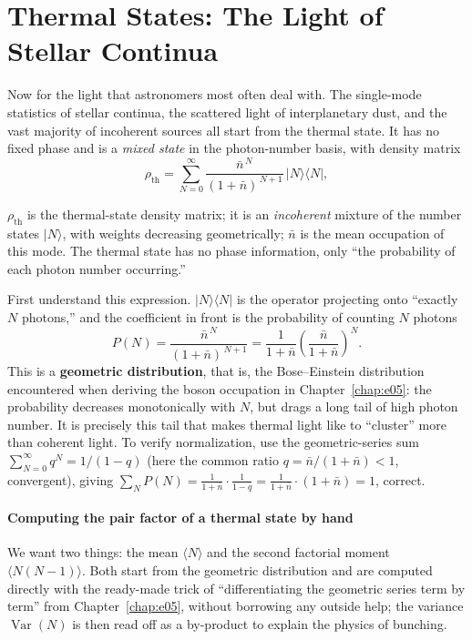 \section{Thermal States: The Light of Stellar Continua}
\label{sec:e06-thermal}

Now for the light that astronomers most often deal with. The single-mode statistics of stellar continua, the scattered light of interplanetary dust, and the vast majority of incoherent sources all start from the thermal state. It has no fixed phase and is a \emph{mixed state} in the photon-number basis, with density matrix
\begin{equation}
  \rho_{\text{th}}=\sum_{N=0}^{\infty}
  \frac{\bar n^{\,N}}{(1+\bar n)^{\,N+1}}\,|N\rangle\langle N|,
  \label{eq:e06-thermal-rho}
\end{equation}
\begin{formulaexplain}
\(\rho_{\text{th}}\) is the thermal-state density matrix; it is an \emph{incoherent} mixture of the number states \(|N\rangle\), with weights decreasing geometrically; \(\bar n\) is the mean occupation of this mode. The thermal state has no phase information, only ``the probability of each photon number occurring.''
\end{formulaexplain}

First understand this expression. \(|N\rangle\langle N|\) is the operator projecting onto ``exactly \(N\) photons,'' and the coefficient in front is the probability of counting \(N\) photons
\[
  P(N)=\frac{\bar n^{\,N}}{(1+\bar n)^{\,N+1}}
  =\frac{1}{1+\bar n}\left(\frac{\bar n}{1+\bar n}\right)^{N}.
\]
This is a \textbf{geometric distribution}, that is, the Bose--Einstein distribution encountered when deriving the boson occupation in Chapter~\ref{chap:e05}: the probability decreases monotonically with \(N\), but drags a long tail of high photon number. It is precisely this tail that makes thermal light like to ``cluster'' more than coherent light. To verify normalization, use the geometric-series sum \(\sum_{N=0}^\infty q^N=1/(1-q)\) (here the common ratio \(q=\bar n/(1+\bar n)<1\), convergent), giving \(\sum_N P(N)=\frac{1}{1+\bar n}\cdot\frac{1}{1-q}=\frac{1}{1+\bar n}\cdot(1+\bar n)=1\), correct.

\paragraph{Computing the pair factor of a thermal state by hand}
\label{sec:e06-thermal-b2}

We want two things: the mean \(\langle N\rangle\) and the second factorial moment \(\langle N(N-1)\rangle\). Both start from the geometric distribution and are computed directly with the ready-made trick of ``differentiating the geometric series term by term'' from Chapter~\ref{chap:e05}, without borrowing any outside help; the variance \(\operatorname{Var}(N)\) is then read off as a by-product to explain the physics of bunching.

